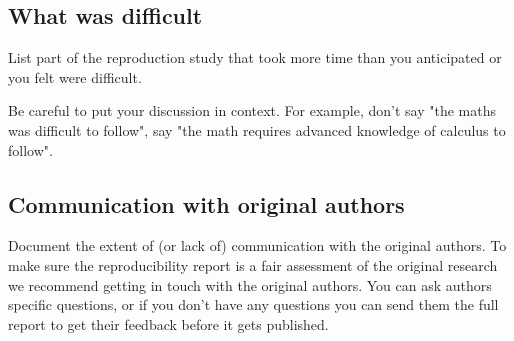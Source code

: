 \subsection{What was difficult}
List part of the reproduction study that took more time than you anticipated or you felt were difficult. 

Be careful to put your discussion in context. For example, don't say "the maths was difficult to follow", say "the math requires advanced knowledge of calculus to follow". 

\subsection{Communication with original authors}
Document the extent of (or lack of) communication with the original authors. To make sure the reproducibility report is a fair assessment of the original research we recommend getting in touch with the original authors. You can ask authors specific questions, or if you don't have any questions you can send them the full report to get their feedback before it gets published. 

